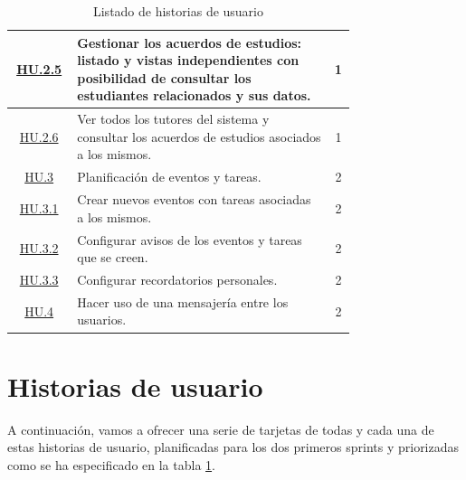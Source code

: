 \begin{table}[H]
\begin{center}
\begin{adjustbox}{width=1\textwidth}
\begin{tabular}{ | c | >{\centering\arraybackslash}p{0.75\linewidth} | c | }
				\hline
					\hyperref[tab:HU2.5]{HU.2.5} & Gestionar los acuerdos de estudios: listado y vistas independientes con posibilidad de consultar los estudiantes relacionados y sus datos. & 1 \\
				\hline
					\hyperref[tab:HU2.6]{HU.2.6} & Ver todos los tutores del sistema y consultar los acuerdos de estudios asociados a los mismos. & 1 \\
				\hline
					\hyperref[tab:HU3]{HU.3} & Planificación de eventos y tareas. & 2 \\
				\hline
					\hyperref[tab:HU3.1]{HU.3.1} & Crear nuevos eventos con tareas asociadas a los mismos. & 2 \\
				\hline
					\hyperref[tab:HU3.2]{HU.3.2} & Configurar avisos de los eventos y tareas que se creen. & 2 \\
				\hline
					\hyperref[tab:HU3.3]{HU.3.3} & Configurar recordatorios personales. & 2 \\
				\hline
					\hyperref[tab:HU4]{HU.4} & Hacer uso de una mensajería entre los usuarios. & 2 \\
				\hline			
			\end{tabular}	
		\end{adjustbox}
		\caption{Listado de historias de usuario}
		\label{tab:listadoHU}
	\end{center}
\end{table}

\section{Historias de usuario}

A continuación, vamos a ofrecer una serie de tarjetas de todas y cada una de estas historias de usuario, planificadas para los dos primeros sprints y priorizadas como se ha especificado en la tabla \ref{tab:listadoHU}.

